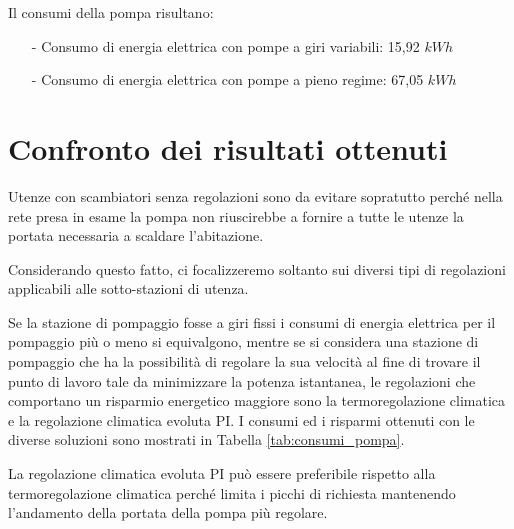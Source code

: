 \documentclass[laurea,oneside,11pt]{USiena_tesiLM3}
\begin{document}
Il consumi della pompa risultano:
\begin{itemize}
\item[-] Consumo di energia elettrica con pompe a giri variabili: 15,92 $kWh$ 
\item[-] Consumo di energia elettrica con pompe a pieno regime: 67,05 $kWh$
\end{itemize}

\section{Confronto dei risultati ottenuti}
Utenze con scambiatori senza regolazioni sono da evitare sopratutto perché nella rete presa in esame la pompa non riuscirebbe a fornire a tutte le utenze la portata necessaria a scaldare l'abitazione.

Considerando questo fatto, ci focalizzeremo soltanto sui diversi tipi di regolazioni applicabili alle sotto-stazioni di utenza. 

Se la stazione di pompaggio fosse a giri fissi i consumi di energia elettrica per il pompaggio più o meno si equivalgono, mentre se si considera una stazione di pompaggio che ha la possibilità di regolare la sua velocità al fine di trovare il punto di lavoro tale da minimizzare la potenza istantanea, le regolazioni che comportano un risparmio energetico maggiore sono la termoregolazione climatica e la regolazione climatica evoluta PI. I consumi ed i risparmi ottenuti con le diverse soluzioni sono mostrati in Tabella \ref{tab:consumi_pompa}.

La regolazione climatica evoluta PI può essere preferibile rispetto alla termoregolazione climatica perché limita i picchi di richiesta mantenendo l'andamento della portata della pompa più regolare.
 
\end{document}
